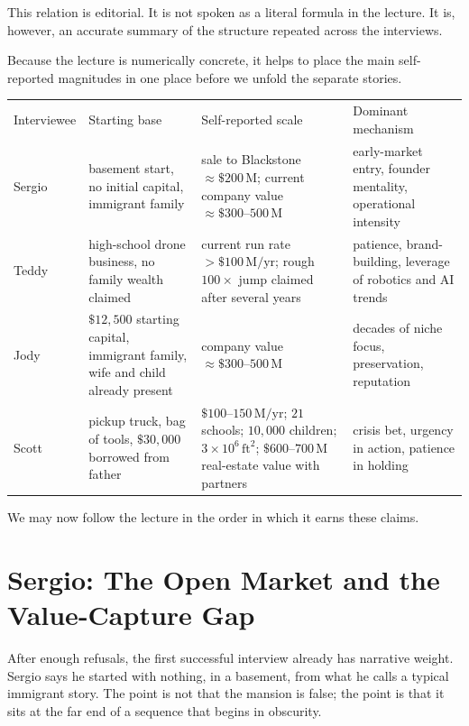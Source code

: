 \begin{remark}
This relation is editorial. It is not spoken as a literal formula in the lecture. It is, however, an accurate summary of the structure repeated across the interviews.
\end{remark}

Because the lecture is numerically concrete, it helps to place the main self-reported magnitudes in one place before we unfold the separate stories.

\begin{table}[h]
\centering
\begin{tabular}{p{1.7cm}p{2.7cm}p{4.2cm}p{4.0cm}}
Interviewee & Starting base & Self-reported scale & Dominant mechanism \\
Sergio & basement start, no initial capital, immigrant family & sale to Blackstone \(\approx \$200\,\mathrm{M}\); current company value \(\approx \$300\text{--}500\,\mathrm{M}\) & early-market entry, founder mentality, operational intensity \\
Teddy & high-school drone business, no family wealth claimed & current run rate \(>\$100\,\mathrm{M/yr}\); rough \(100\times\) jump claimed after several years & patience, brand-building, leverage of robotics and AI trends \\
Jody & \(\$12{,}500\) starting capital, immigrant family, wife and child already present & company value \(\approx \$300\text{--}500\,\mathrm{M}\) & decades of niche focus, preservation, reputation \\
Scott & pickup truck, bag of tools, \(\$30{,}000\) borrowed from father & \(\$100\text{--}150\,\mathrm{M/yr}\); \(21\) schools; \(10{,}000\) children; \(3\times10^6\,\mathrm{ft}^2\); \(\$600\text{--}700\,\mathrm{M}\) real-estate value with partners & crisis bet, urgency in action, patience in holding \\
\end{tabular}
\end{table}

We may now follow the lecture in the order in which it earns these claims.

\section{Sergio: The Open Market and the Value-Capture Gap}

After enough refusals, the first successful interview already has narrative weight. Sergio says he started with nothing, in a basement, from what he calls a typical immigrant story. The point is not that the mansion is false; the point is that it sits at the far end of a sequence that begins in obscurity.

